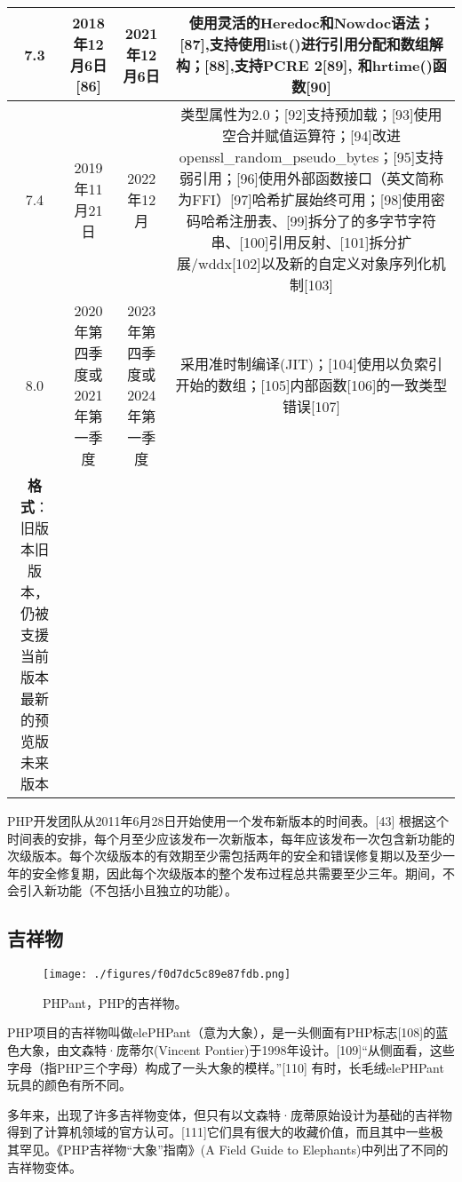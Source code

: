 \begin{table}[ht]
\begin{tabular}{|c|c|c|c}
\hline
7.3 & 2018年12月6日[86] & 2021年12月6日 & 使用灵活的Heredoc和Nowdoc语法；[87],支持使用list()进行引用分配和数组解构；[88],支持PCRE 2[89], 和hrtime()函数[90]\\
\hline
7.4 & 2019年11月21日 & 2022年12月 & 类型属性为2.0；[92]支持预加载；[93]使用空合并赋值运算符；[94]改进openssl_random_pseudo_bytes；[95]支持弱引用；[96]使用外部函数接口（英文简称为FFI）[97]哈希扩展始终可用；[98]使用密码哈希注册表、[99]拆分了的多字节字符串、[100]引用反射、[101]拆分扩展/wddx[102]以及新的自定义对象序列化机制[103]\\
\hline
8.0 & 2020年第四季度或2021年第一季度 & 2023年第四季度或2024年第一季度 & 采用准时制编译(JIT)；[104]使用以负索引开始的数组；[105]内部函数[106]的一致类型错误[107]\\
\hline
\textbf{格式}：旧版本旧版本，仍被支援当前版本最新的预览版未来版本 &  &  & \\
\hline
\end{tabular}
\end{table}
PHP开发团队从2011年6月28日开始使用一个发布新版本的时间表。[43] 根据这个时间表的安排，每个月至少应该发布一次新版本，每年应该发布一次包含新功能的次级版本。每个次级版本的有效期至少需包括两年的安全和错误修复期以及至少一年的安全修复期，因此每个次级版本的整个发布过程总共需要至少三年。期间，不会引入新功能（不包括小且独立的功能）。

\subsection{吉祥物}
\begin{figure}[ht]
\centering
\texttt{[image: ./figures/f0d7dc5c89e87fdb.png]}
\caption{PHPant，PHP的吉祥物。} \label{fig_PHP_5}
\end{figure}

PHP项目的吉祥物叫做elePHPant（意为大象），是一头侧面有PHP标志[108]的蓝色大象，由文森特·庞蒂尔(Vincent Pontier)于1998年设计。[109]“从侧面看，这些字母（指PHP三个字母）构成了一头大象的模样。”[110] 有时，长毛绒elePHPant玩具的颜色有所不同。

多年来，出现了许多吉祥物变体，但只有以文森特·庞蒂原始设计为基础的吉祥物得到了计算机领域的官方认可。[111]它们具有很大的收藏价值，而且其中一些极其罕见。《PHP吉祥物“大象”指南》(A Field Guide to Elephants)中列出了不同的吉祥物变体。

